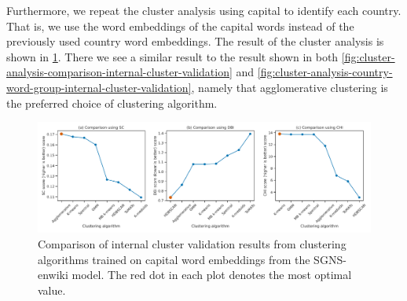 Furthermore, we repeat the cluster analysis using capital to identify each country. That is, we use the word embeddings of the capital words instead of the previously used country word embeddings. The result of the cluster analysis is shown in \cref{fig:cluster-analysis-country-capitals-word-group-internal-cluster-validation}. There we see a similar result to the result shown in both \cref{fig:cluster-analysis-comparison-internal-cluster-validation} and \cref{fig:cluster-analysis-country-word-group-internal-cluster-validation}, namely that agglomerative clustering is the preferred choice of clustering algorithm.
\begin{figure}[H]
    \centering
    \includegraphics[width=\textwidth]{thesis/figures/cluster-analysis-country-capitals-word-group-internal-cluster-validation.pdf}
    \caption{Comparison of internal cluster validation results from clustering algorithms trained on capital word embeddings from the SGNS-enwiki model. The red dot in each plot denotes the most optimal value.}
    \label{fig:cluster-analysis-country-capitals-word-group-internal-cluster-validation}
\end{figure}

